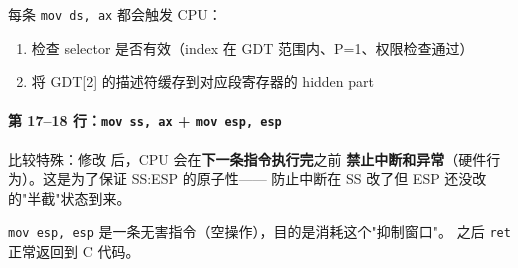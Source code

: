 每条 \texttt{mov ds, ax} 都会触发 CPU：
\begin{enumerate}
  \item 检查 selector 是否有效（index 在 GDT 范围内、P=1、权限检查通过）
  \item 将 GDT[2] 的描述符缓存到对应段寄存器的 hidden part
\end{enumerate}

\paragraph{第 17--18 行：\texttt{mov ss, ax} + \texttt{mov esp, esp}}

 比较特殊：修改  后，CPU 会在\textbf{下一条指令执行完}之前
\textbf{禁止中断和异常}（硬件行为）。这是为了保证 SS:ESP 的原子性——
防止中断在 SS 改了但 ESP 还没改的"半截"状态到来。

\texttt{mov esp, esp} 是一条无害指令（空操作），目的是消耗这个"抑制窗口"。
之后 \texttt{ret} 正常返回到 C 代码。


